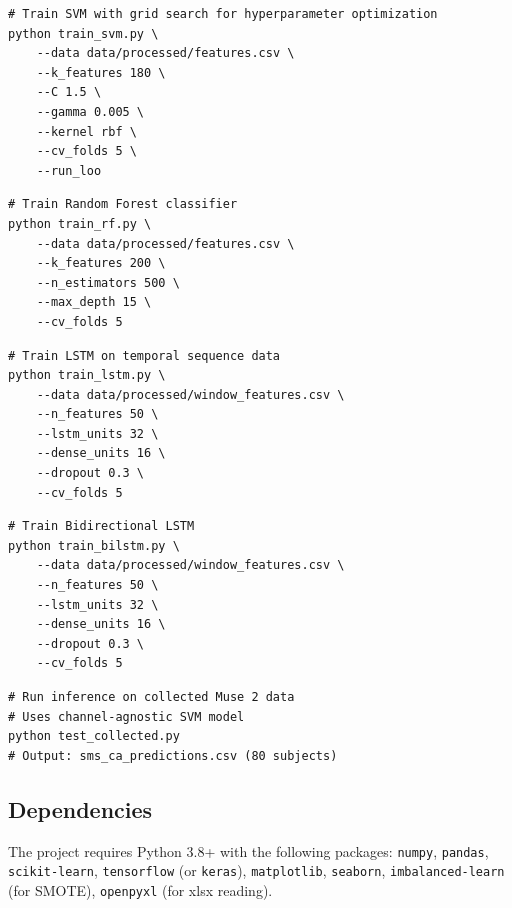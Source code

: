 \documentclass[12pt,a4paper]{article}
\begin{document}
\begin{lstlisting}[caption={Step 2: Train SVM model},label={lst:svm}]
# Train SVM with grid search for hyperparameter optimization
python train_svm.py \
    --data data/processed/features.csv \
    --k_features 180 \
    --C 1.5 \
    --gamma 0.005 \
    --kernel rbf \
    --cv_folds 5 \
    --run_loo
\end{lstlisting}

\begin{lstlisting}[caption={Step 3: Train Random Forest model},label={lst:rf}]
# Train Random Forest classifier
python train_rf.py \
    --data data/processed/features.csv \
    --k_features 200 \
    --n_estimators 500 \
    --max_depth 15 \
    --cv_folds 5
\end{lstlisting}

\begin{lstlisting}[caption={Step 4: Train LSTM model},label={lst:lstm}]
# Train LSTM on temporal sequence data
python train_lstm.py \
    --data data/processed/window_features.csv \
    --n_features 50 \
    --lstm_units 32 \
    --dense_units 16 \
    --dropout 0.3 \
    --cv_folds 5
\end{lstlisting}

\begin{lstlisting}[caption={Step 5: Train Bi-LSTM model},label={lst:bilstm}]
# Train Bidirectional LSTM
python train_bilstm.py \
    --data data/processed/window_features.csv \
    --n_features 50 \
    --lstm_units 32 \
    --dense_units 16 \
    --dropout 0.3 \
    --cv_folds 5
\end{lstlisting}

\begin{lstlisting}[caption={Step 6: Test on collected data (SMS@19nov68)},label={lst:test}]
# Run inference on collected Muse 2 data
# Uses channel-agnostic SVM model
python test_collected.py
# Output: sms_ca_predictions.csv (80 subjects)
\end{lstlisting}

\subsection{Dependencies}

The project requires Python 3.8+ with the following packages: \texttt{numpy}, \texttt{pandas}, \texttt{scikit-learn}, \texttt{tensorflow} (or \texttt{keras}), \texttt{matplotlib}, \texttt{seaborn}, \texttt{imbalanced-learn} (for SMOTE), \texttt{openpyxl} (for xlsx reading).
\end{document}
